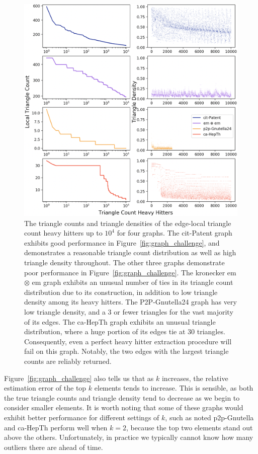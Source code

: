 \documentclass[10]{report}
\begin{document}
\begin{figure}
	\centerline{\includegraphics[width=1.0\columnwidth]{hh_comp_4}}
	\caption{The triangle counts and triangle densities of the edge-local triangle count heavy hitters up to $10^4$ for four graphs.
	The cit-Patent graph exhibits good performance in Figure~\ref{fig:graph_challenge}, and demonstrates a reasonable triangle count distribution as well as high triangle density throughout.
	The other three graphs demonstrate poor performance in Figure~\ref{fig:graph_challenge}.
	The kronecker em $\otimes$ em graph exhibits an unusual number of ties in its triangle count distribution due to its construction, in addition to low triangle density among its heavy hitters.
	The P2P-Gnutella24 graph has very low triangle density, and a 3 or fewer triangles for the vast majority of its edges.
	The ca-HepTh graph exhibits an unusual triangle distribution, where a huge portion of its edges tie at 30 triangles.
	Consequently, even a perfect heavy hitter extraction procedure will fail on this graph.
	Notably, the two edges with the largest triangle counts are reliably returned.
	\label{fig:hh_comp}}
\end{figure}

Figure~\ref{fig:graph_challenge} also tells us that as $k$ increases, the relative estimation error of the top $k$ elements tends to increase.
This is sensible, as both the true triangle counts and triangle density tend to decrease as we begin to consider smaller elements.
It is worth noting that some of these graphs would exhibit better performance for different settings of $k$, such as noted p2p-Gnutella and ca-HepTh perform well when $k=2$, because the top two elements stand out above the others.
Unfortunately, in practice we typically cannot know how many outliers there are ahead of time.
\end{document}
